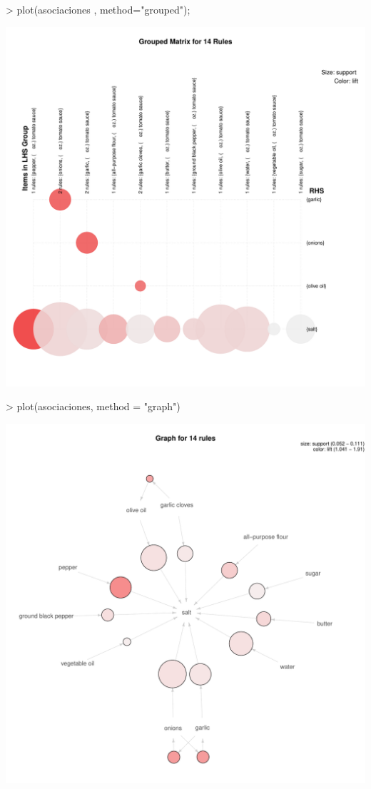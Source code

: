 \documentclass [a4paper] {article}
\begin{document}
\begin{Schunk}
\begin{Sinput}
> plot(asociaciones , method="grouped");
\end{Sinput}
\end{Schunk}
\includegraphics{Practica2-agrup1}
\begin{Schunk}
\begin{Sinput}
> plot(asociaciones, method = "graph")
\end{Sinput}
\end{Schunk}
\includegraphics{Practica2-grafo1}
\end{document}
